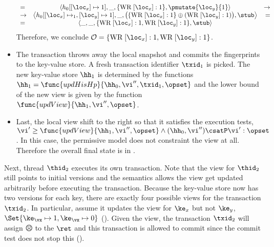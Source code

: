\begin{itemize}
{\begin{equation}
\begin{array}{lcr}
=&\left \langle h_0[[\loc_x] \mapsto 1], \_, \{\text{WR}\; [\loc_x]: 1\}, 
\pmutate{\loc_y}{1} \right\rangle 
&\rightarrow\\ 
\rightarrow & 
\left\langle h_0[[\loc_x] \mapsto_1, [\loc_y] \mapsto 1], \_, \big( \{\text{WR}\;[\loc_x]:1\} \oplus  (\text{WR}\;[\loc_y]: 1) \big), 
\stub \right\rangle & = \\
=& \left \langle \_, \_, \{\text{WR}\;[\loc_x]: 1, \text{WR}\;[\loc_y]:1 \}, \stub \right\rangle
\end{array}
\end{equation}
Therefore, we conclude $\mathcal{O} = \{\text{WR}\; [\loc_x] : 1, \text{WR}\;[\loc_y]:1\}$.
}
\item 
The transaction throws away the local snapshot and commits the fingerprints to the key-value store.
A fresh transaction identifier \( \txid_{1} \) is picked.
The new key-value store \( \hh_{1} \) is determined by the functions $\hh_{1} = \func{updHisHp}{\hh_0, \vi'',\txid_1, \opset}$ and the lower bound of the new view is given by the function \( \func{updView}{\hh_1, \vi'' ,\opset}\).
\item Last, the local view shift to the right so that it satisfies the execution tests, \( \vi' \geq \func{updView}{\hh_1, \vi'' ,\opset} \land (\hh_{0}, \vi'') \csatP \vi' : \opset \).
In this case, the permissive model does not constraint the view at all.
Therefore the overall final state is in .
\end{itemize}

Next, thread $\thid_2$ executes its own transaction.
Note that the view for \( \thid_2\) still points to initial versions and the semantics allows the view get updated arbitrarily before executing the transaction.
Because the key-value store now has two versions for each key, there are exactly four possible views for the transaction \( \txid_{2} \).
In particular, assume it updates the view for \( \ke_{x} \) but not \( \ke_y \), \ie \( \Set{\ke_\vx \mapsto 1, \ke_\vx \mapsto 0} \) ().
Given the view, the transaction \( \txid_{2} \) will assign \(\sadface\) to the \( \ret\) and this transaction is allowed to commit since the commit test does not stop this ().

